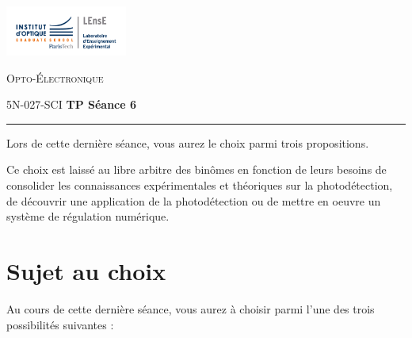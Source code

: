 \newpage

\begin{minipage}[c]{.25\linewidth}
	\includegraphics[width=4cm]{images/Logo-LEnsE.png}
\end{minipage} \hfill
\begin{minipage}[c]{.4\linewidth}

\begin{center}
\vspace{0.3cm}
{\Large \textsc{Opto-Électronique}}

\medskip

5N-027-SCI \qquad \textbf{\Large TP Séance 6}

\end{center}
\end{minipage}\hfill

\bigskip

\noindent \rule{\linewidth}{1pt}

Lors de cette dernière séance, vous aurez le choix parmi trois propositions.

Ce choix est laissé au libre arbitre des binômes en fonction de leurs besoins de consolider les connaissances expérimentales et théoriques sur la photodétection, de découvrir une application de la photodétection ou de mettre en oeuvre un système de régulation numérique.

\section{Sujet au choix}

Au cours de cette dernière séance, vous aurez à choisir parmi l'une des trois possibilités suivantes :

